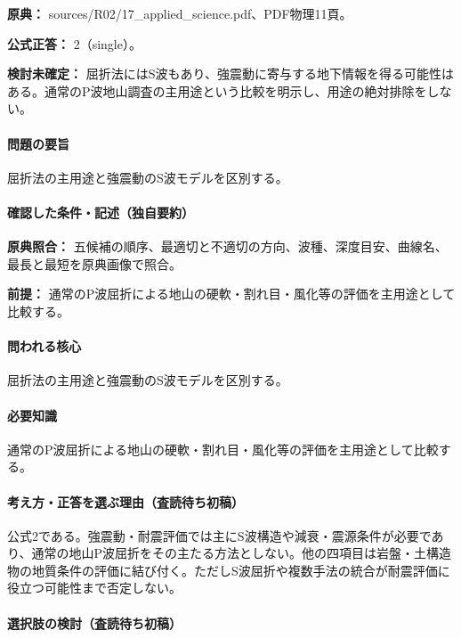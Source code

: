 \noindent\textbf{原典：} sources/R02/17\_applied\_science.pdf、PDF物理11頁。

\textbf{公式正答：} 2（single）。

\par\textbf{検討未確定：} 屈折法にはS波もあり、強震動に寄与する地下情報を得る可能性はある。通常のP波地山調査の主用途という比較を明示し、用途の絶対排除をしない。

\paragraph{問題の要旨} 屈折法の主用途と強震動のS波モデルを区別する。

\paragraph{確認した条件・記述（独自要約）}\mbox{}\par

\noindent\textbf{原典照合：} 五候補の順序、最適切と不適切の方向、波種、深度目安、曲線名、最長と最短を原典画像で照合。\par

\noindent\textbf{前提：} 通常のP波屈折による地山の硬軟・割れ目・風化等の評価を主用途として比較する。\par

\paragraph{問われる核心} 屈折法の主用途と強震動のS波モデルを区別する。

\paragraph{必要知識} 通常のP波屈折による地山の硬軟・割れ目・風化等の評価を主用途として比較する。

\paragraph{考え方・正答を選ぶ理由（査読待ち初稿）} 公式2である。強震動・耐震評価では主にS波構造や減衰・震源条件が必要であり、通常の地山P波屈折をその主たる方法としない。他の四項目は岩盤・土構造物の地質条件の評価に結び付く。ただしS波屈折や複数手法の統合が耐震評価に役立つ可能性まで否定しない。

\paragraph{選択肢の検討（査読待ち初稿）}\mbox{}\par

